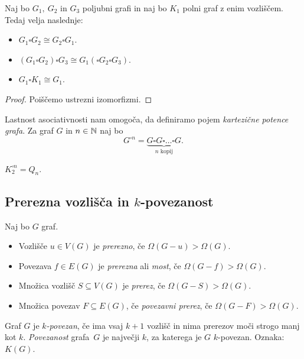 \begin{trditev}
    Naj bo $G_1, \ G_2$ in $G_3$ poljubni grafi in naj bo $K_1$ polni graf z enim vozliščem. Tedaj velja naslednje:
    \begin{itemize}
        \item $G_1 \square G_2 \cong G_2 \square G_1$.
        \item $(G_1 \square G_2) \square G_3 \cong G_1 (\square G_2 \square G_3)$.
        \item $G_1 \square K_1 \cong G_1$.
    \end{itemize}
\end{trditev}

\begin{proof}
    Poiščemo ustrezni izomorfizmi.
\end{proof}

Lastnost asociativnosti nam omogoča, da definiramo pojem \emph{kartezične potence grafa}. Za graf $G$ in $n \in \mathbb{N}$ naj bo $$G^{\square n} = \underbrace{G \square G \square \ldots \square G}_\text{$n$ kopij}.$$

\begin{primer}
    $K_2^{\square n} = Q_n$.
\end{primer}

\subsection{Prerezna vozlišča in $k$-povezanost}
\begin{definicija}
    Naj bo $G$ graf.
    \begin{itemize}
        \item Vozlišče $u \in V(G)$ je \emph{prerezno}, če $\Omega(G-u) > \Omega(G)$.
        \item Povezava $f \in E(G)$ je \emph{prerezna} ali \emph{most}, če $\Omega(G-f) > \Omega(G)$.
        \item Množica vozlišč $S \subseteq V(G)$ je \emph{prerez}, če $\Omega(G-S) > \Omega(G)$.
        \item Množica povezav $F \subseteq E(G)$, če \emph{povezavni prerez}, če $\Omega(G-F) > \Omega(G)$.
    \end{itemize}
\end{definicija}

\begin{definicija}
    Graf $G$ je \emph{$k$-povezan}, če ima vsaj $k+1$ vozlišč in nima prerezov moči strogo manj kot $k$. \emph{Povezanost} grafa~$G$ je največji $k$, za katerega je $G$ $k$-povezan. Oznaka: $K(G)$.
\end{definicija}

